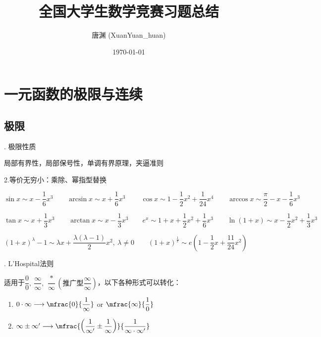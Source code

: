 \documentclass[UTF8]{ctexart}
\title{\heiti 全国大学生数学竞赛习题总结}
\author{\kaishu 唐渊 (XuanYuan\_huan)}
\date{\today}
\newcommand\no{\noindent}
\begin{document}
    
\maketitle

\newpage

\tableofcontents

\newpage

\section{一元函数的极限与连续}

\subsection{极限}

\begin{spacing}{2}

\no 1. 极限性质

局部有界性，局部保号性，单调有界原理，夹逼准则

\no 2.等价无穷小：乘除、幂指型替换

$\sin x \sim x-\dfrac{1}{6}x^3 \qquad \arcsin x \sim x+\dfrac{1}{6}x^3\
\qquad \cos x \sim 1-\dfrac{1}{2}x^2+\dfrac{1}{24}x^4 \qquad 
\arccos x \sim \dfrac{\pi}{2}-x-\dfrac{1}{6}x^3  $

\vspace{0.3cm}

$ \tan x \sim x+\dfrac{1}{3}x^3\qquad \arctan x \sim x-\dfrac{1}{3}x^3 \qquad
e^x\sim 1+x+\dfrac{1}{2}x^2+\dfrac{1}{6}x^3\qquad \ln(1+x)\sim x-\dfrac{1}{2}x^2
+\dfrac{1}{3}x^3$

\vspace{0.3cm}

$(1+x)^\lambda-1\sim \lambda x+\dfrac{\lambda(\lambda-1)}{2}x^2,\ \lambda\neq0
\qquad (1+x)^{\tfrac{1}{x}}\sim e\left(1-\dfrac{1}{2}x+\dfrac{11}{24}x^2\right)$

\no 3. L'Hospital法则

适用于$\dfrac{0}{0},\ \dfrac{\infty}{\infty},\ \dfrac{*}{\infty}\left(\text{推广型}\dfrac{\infty}{\infty}\right)$，以下各种形式可以转化：

\begin{enumerate}[itemindent=1.4em, label=(\arabic*)]

\item $0\cdot\infty\longrightarrow\mfrac{0}{\dfrac{1}{\infty}}$ or $\mfrac{\infty}{\dfrac{1}{0}}$

\item $\infty\pm\infty'\longrightarrow\mfrac{\left(\dfrac{1}{\infty'}\pm\dfrac{1}{\infty}\right)}{\dfrac{1}{\infty\cdot\infty'}}$


\end{enumerate}
\end{spacing}
\end{document}
